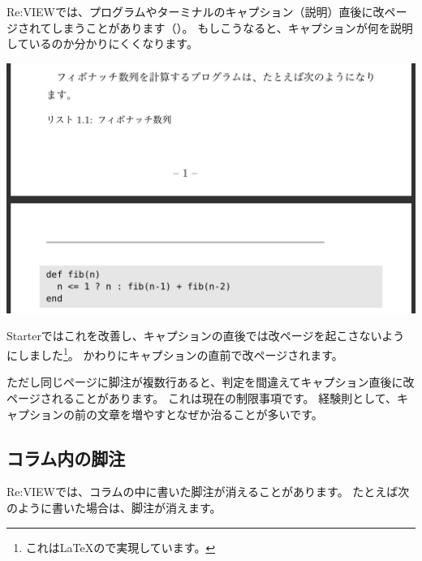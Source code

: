Re:VIEWでは、プログラムやターミナルのキャプション（説明）直後に改ページされてしまうことがあります（）。
もしこうなると、キャプションが何を説明しているのか分かりにくくなります。

\begin{reviewimage}%
\includegraphics[width=0.8\maxwidth]{./images/chap01-starter/caption_pagebreak.png}%
\label{image:chap01-starter:caption_pagebreak}
\end{reviewimage}

Starterではこれを改善し、キャプションの直後では改ページを起こさないようにしました\footnote{これは\LaTeX{}ので実現しています。}。
かわりにキャプションの直前で改ページされます。

ただし同じページに脚注が複数行あると、判定を間違えてキャプション直後に改ページされることがあります。
これは現在の制限事項です。
経験則として、キャプションの前の文章を増やすとなぜか治ることが多いです。

\subsection*{コラム内の脚注}
\label{sec:1-1-12}

Re:VIEWでは、コラムの中に書いた脚注が消えることがあります。
たとえば次のように書いた場合は、脚注が消えます。

\begin{starterprogram}\end{starterprogram}

